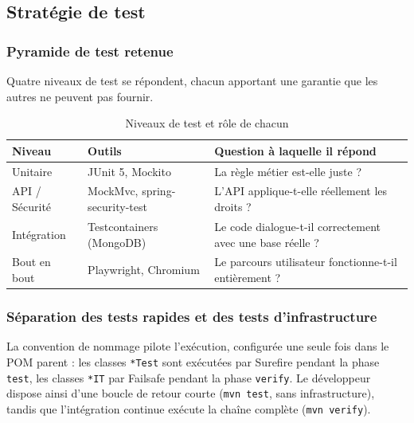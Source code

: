 
\subsection{Stratégie de test}

\subsubsection{Pyramide de test retenue}
Quatre niveaux de test se répondent, chacun apportant une garantie que les autres ne
peuvent pas fournir.

\begin{table}[H]\centering\renewcommand{\arraystretch}{1.3}
\begin{tabular}{|p{3.2cm}|p{5cm}|p{6cm}|}\hline
\rowcolor{gray!15}\textbf{Niveau} & \textbf{Outils} & \textbf{Question à laquelle il répond} \\ \hline
Unitaire & JUnit 5, Mockito & La règle métier est-elle juste ? \\ \hline
API / Sécurité & MockMvc, spring-security-test & L'API applique-t-elle réellement les droits ? \\ \hline
Intégration & Testcontainers (MongoDB) & Le code dialogue-t-il correctement avec une base réelle ? \\ \hline
Bout en bout & Playwright, Chromium & Le parcours utilisateur fonctionne-t-il entièrement ? \\ \hline
\end{tabular}
\caption{Niveaux de test et rôle de chacun}\label{tab:pyramide}
\end{table}

\subsubsection{Séparation des tests rapides et des tests d'infrastructure}
La convention de nommage pilote l'exécution, configurée une seule fois dans le POM parent :
les classes \texttt{*Test} sont exécutées par Surefire pendant la phase \texttt{test}, les
classes \texttt{*IT} par Failsafe pendant la phase \texttt{verify}. Le développeur dispose
ainsi d'une boucle de retour courte (\texttt{mvn test}, sans infrastructure), tandis que
l'intégration continue exécute la chaîne complète (\texttt{mvn verify}).

